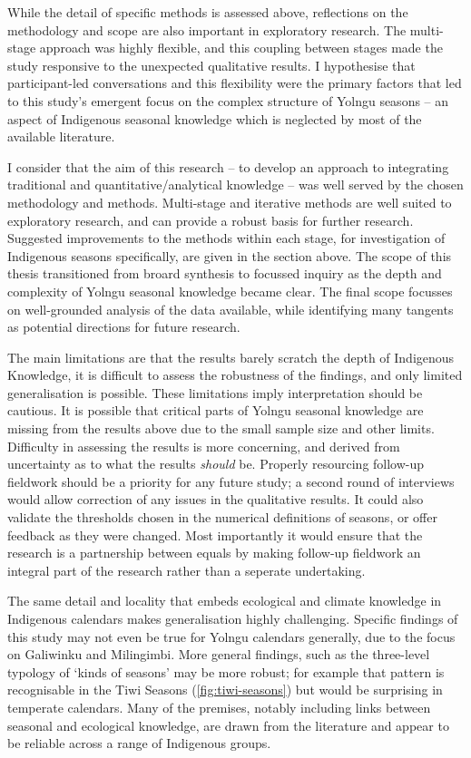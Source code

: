 While the detail of specific methods is assessed above, reflections on the
methodology and scope are also important in exploratory research.  The
multi-stage approach was highly flexible, and this coupling between stages
made the study responsive to the unexpected qualitative results.  I hypothesise
that participant-led conversations and this flexibility were the primary
factors that led to this study's emergent focus on the complex structure of
Yolngu seasons -- an aspect of Indigenous seasonal knowledge which is neglected
by most of the available literature.

I consider that the aim of this research -- to develop an approach to
integrating traditional and quantitative/analytical knowledge -- was well
served by the chosen methodology and methods.  Multi-stage and iterative
methods are well suited to exploratory research, and can provide a robust
basis for further research.  Suggested improvements to the methods within
each stage, for investigation of Indigenous seasons specifically, are given
in the section above.  The scope of this thesis transitioned from broard
synthesis to focussed inquiry as the depth and complexity of Yolngu seasonal
knowledge became clear.  The final scope focusses on well-grounded analysis
of the data available, while identifying many tangents as potential directions
for future research.

The main limitations are that the results barely scratch
the depth of Indigenous Knowledge, it is difficult to assess the robustness
of the findings, and only limited generalisation is possible.  These
limitations imply interpretation should be cautious.  It is possible that
critical parts of Yolngu seasonal knowledge are missing from the results
above due to the small sample size and other limits.
%
Difficulty in assessing the results is more concerning, and derived from
uncertainty as to what the results \textit{should} be.   Properly resourcing
follow-up fieldwork should be a priority for any future study; a second round
of interviews would allow correction of any issues in the qualitative results.
It could also validate the thresholds chosen in the numerical definitions of
seasons, or offer feedback as they were changed.  Most importantly it would
ensure that the research is a partnership between equals by making follow-up
fieldwork an integral part of the research rather than a seperate undertaking.

The same detail and locality that embeds ecological and climate knowledge in
Indigenous calendars makes generalisation highly challenging.  Specific
findings of this study may not even be true for Yolngu calendars generally,
due to the focus on Galiwinku and Milingimbi.  More general findings, such as
the three-level typology of `kinds of seasons' may be more robust; for example
that pattern is recognisable in the Tiwi Seasons (\cref{fig:tiwi-seasons})
but would be surprising in temperate calendars.  Many of the premises, notably
including links between seasonal and ecological knowledge, are drawn from the
literature and appear to be reliable across a range of Indigenous groups.



